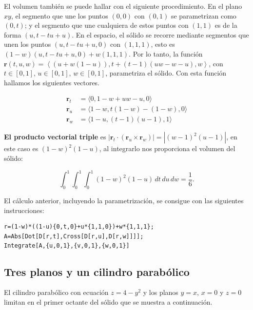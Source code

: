 El volumen también se puede hallar con el siguiente procedimiento. En el plano $xy$, el segmento que une los puntos $(0,0)$ con $(0,1)$ se parametrizan como $(0,t)$; y el segmento que une cualquiera de estos puntos con $(1,1)$ es de la forma $(u, t - tu + u)$. En el espacio, el sólido se recorre mediante segmentos que unen los puntos $(u, t - tu + u, 0)$ con $(1, 1, 1)$, esto es $(1-w)(u, t - tu + u, 0) + w(1, 1, 1)$. Por lo tanto, la función $\mathbf{r}(t, u, w) = \left\langle (u + w(1-u)), t + (t-1)(uw - w - u), w \right\rangle$, con $t \in [0,1]$, $u \in [0,1]$, $w \in [0,1]$, parametriza el sólido. Con esta función hallamos los siguientes vectores.

\begin{align*}
  \mathbf{r}_{t} &= \langle 0, 1 - w + uw - u, 0 \rangle \\
  \mathbf{r}_{u} &= \langle 1 - w, t(1 - w) - (1 - w), 0 \rangle \\
  \mathbf{r}_{w} &= \langle 1 - u, (t - 1)(u - 1), 1 \rangle
\end{align*}

\textbf{El producto vectorial triple} es $|\mathbf{r}_{t} \cdot (\mathbf{r}_{u} \times \mathbf{r}_{w})| = |(w-1)^{2}(u-1)|$, en este caso es $(1-w)^{2}(1-u)$, al integrarlo nos proporciona el volumen del sólido:

\[ \int_{0}^{1}\int_{0}^{1}\int_{0}^{1} (1-w)^{2}(1-u) \, dt\,du\,dw = \frac{1}{6}. \]


El cálculo anterior, incluyendo la parametrización, se consigue con las siguientes instrucciones:

\begin{tcolorbox}[title=\bf Instrucción en \verb"Mathematica"]\begin{Verbatim}[formatcom=\letraverbatim]
r=(1-w)*((1-u){0,t,0}+u*{1,1,0})+w*{1,1,1};
A=Abs[Dot[D[r,t],Cross[D[r,u],D[r,w]]]];
Integrate[A,{u,0,1},{v,0,1},{w,0,1}]
\end{Verbatim}
\end{tcolorbox}

\subsection{Tres planos y un cilindro parabólico}
El cilindro parabólico con ecuación $z=4-y^{2}$ y los planos $y=x$, $x=0$ y $z=0$ limitan en el primer octante del sólido que se muestra a conti\-nuación.

